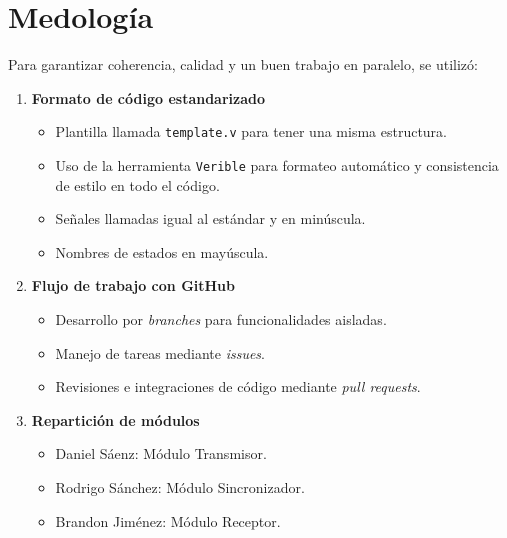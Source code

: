 \section{Medología}
Para garantizar coherencia, calidad y un buen trabajo en paralelo, se utilizó:

\begin{enumerate}[label=\textbf{\arabic*.}]
    \item \textbf{Formato de código estandarizado}
    
    \begin{itemize}
        \item Plantilla llamada \texttt{template.v} para tener una misma estructura.
        \item Uso de la herramienta \texttt{Verible} para formateo automático y consistencia de estilo en todo el código.
        \item Señales llamadas igual al estándar y en minúscula.
        \item Nombres de estados en mayúscula.
    \end{itemize}
    
    \item \textbf{Flujo de trabajo con GitHub}
    
    \begin{itemize}
        \item Desarrollo por \textit{branches} para funcionalidades aisladas.
        \item Manejo de tareas mediante \textit{issues}.
        \item Revisiones e integraciones de código mediante \textit{pull requests}.
    \end{itemize}
    
    \item \textbf{Repartición de módulos}
    
    \begin{itemize}
        \item Daniel Sáenz: Módulo Transmisor.
        \item Rodrigo Sánchez: Módulo Sincronizador.
        \item Brandon Jiménez: Módulo Receptor.
    \end{itemize}
\end{enumerate}
